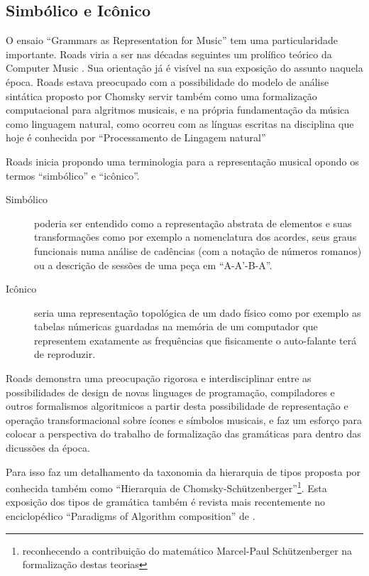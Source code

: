 \documentclass[
	12pt,				%
	openright,			%
	twoside,			%
	a4paper,			%
	english,			%
	french,				%
	spanish,			%
	brazil				%
	]{abntex2}
\begin{document}
\subsection{Simbólico e Icônico}

O ensaio “Grammars as Representation for Music”\cite{roads1979grammars} tem uma particularidade importante. Roads viria a ser nas décadas seguintes um prolífico teórico da Computer Music \cite{curtis1996computer,roads2004microsound} . Sua orientação já é visível na sua exposição do assunto naquela época. Roads estava preocupado com a possibilidade do modelo de análise sintática proposto por Chomsky servir também como uma formalização computacional para algritmos musicais, e na própria fundamentação da música como linguagem natural, como ocorreu com as línguas escritas na disciplina que hoje é conhecida por “Processamento de Lingagem natural”\cite{bird2009natural}

Roads inicia propondo uma terminologia para a representação musical opondo os termos “simbólico” e “icônico”. 

\pagebreak
\begin{description}

\item[Simbólico] poderia ser entendido como a representação abstrata de elementos e suas transformações como por exemplo a nomenclatura dos acordes, seus graus funcionais numa análise de cadências (com a notação de números romanos) ou a descrição de sessões de uma peça em “A-A'-B-A”. 

\item[Icônico] seria uma representação topológica de um dado físico como por exemplo as tabelas númericas guardadas na memória de um computador que representem exatamente as frequências que fisicamente o auto-falante terá de reproduzir.
\end{description}

Roads demonstra uma preocupação rigorosa e interdisciplinar entre as possibilidades de design de novas linguages de programação, compiladores e outros formalismos algoritmicos a partir desta possibilidade de representação e operação transformacional sobre ícones e símbolos musicais, e faz um esforço para colocar a perspectiva do trabalho de formalização das gramáticas para dentro das dicussões da época.

Para isso faz um detalhamento da taxonomia da hierarquia de tipos proposta por  conhecida também como “Hierarquia de Chomsky-Schützenberger”\footnote{reconhecendo a contribuição do matemático Marcel-Paul Schützenberger na formalização destas teorias}. Esta exposição dos tipos de gramática também é revista mais recentemente no enciclopédico “Paradigms of Algorithm composition” de .
\end{document}
